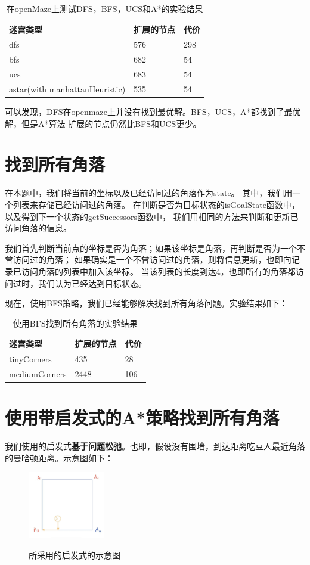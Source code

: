 \documentclass{article}
\begin{document}
	\begin{table}[H]
		\centering
		\caption{在openMaze上测试DFS，BFS，UCS和A*的实验结果}
		\begin{tabular}{lll}
			\hline
		迷宫类型                           & 扩展的节点 & 代价  \\ \hline
		dfs                            & 576   & 298 \\
		bfs                            & 682   & 54  \\
		ucs                            & 683   & 54  \\
		astar(with manhattanHeuristic) & 535   & 54 \\ \hline
		\end{tabular}
		\end{table}

可以发现，DFS在openmaze上并没有找到最优解。BFS，UCS，A*都找到了最优解，但是A*算法
扩展的节点仍然比BFS和UCS更少。

\section{找到所有角落}
在本题中，我们将当前的坐标以及已经访问过的角落作为state。
其中，我们用一个列表来存储已经访问过的角落。
在判断是否为目标状态的isGoalState函数中，以及得到下一个状态的getSuccessors函数中，
我们用相同的方法来判断和更新已访问角落的信息。

我们首先判断当前点的坐标是否为角落；如果该坐标是角落，再判断是否为一个不曾访问过的角落；
如果确实是一个不曾访问过的角落，则将信息更新，也即向记录已访问角落的列表中加入该坐标。
当该列表的长度到达4，也即所有的角落都访问过时，我们认为已经达到目标状态。

现在，使用BFS策略，我们已经能够解决找到所有角落问题。实验结果如下：
\begin{table}[H]
	\centering
	\caption{使用BFS找到所有角落的实验结果}
	\begin{tabular}{lll}
		\hline
	迷宫类型          & 扩展的节点 & 代价  \\ \hline
	tinyCorners   & 435   & 28  \\
	mediumCorners & 2448  & 106\\ \hline
	\end{tabular}
	\end{table}

\section{使用带启发式的A*策略找到所有角落}
我们使用的启发式\textbf{基于问题松弛}。也即，假设没有围墙，到达距离吃豆人最近角落
的曼哈顿距离。示意图如下：
\begin{figure}[H]
	\centering
	{\includegraphics[width=0.3\textwidth]{image//启发式示意图.jpg}} \label{Hfunc}
	\caption{所采用的启发式的示意图}
\end{figure}
\end{document}
